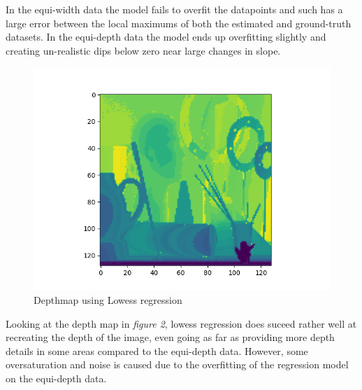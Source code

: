 \documentclass[letterpaper,12pt]{article}
\begin{document}
In the equi-width data the model fails to overfit the datapoints and such has a large error
between the local maximums of both the estimated and ground-truth datasets. In the equi-depth
data the model ends up overfitting slightly and creating un-realistic dips below zero near large
changes in slope. 
\begin{figure}[H]
\centering
\includegraphics{lowess_depthmap}
\caption{Depthmap using Lowess regression}
\end{figure}
Looking at the depth map in \emph{figure 2}, lowess regression does suceed rather well at 
recreating the depth of the image, even going as far as providing more depth details
in some areas compared to the equi-depth data. However, some oversaturation and noise is caused
due to the overfitting of the regression model on the equi-depth data.
\end{document}
